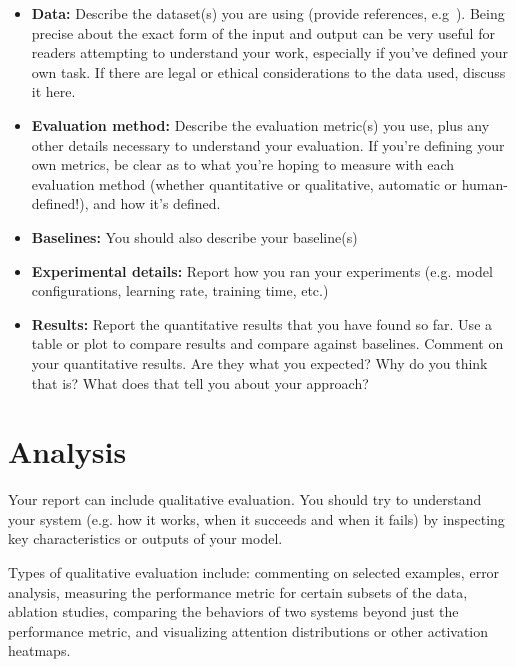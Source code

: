 \documentclass[11pt]{article}
\begin{document}
\begin{itemize}
    \item \textbf{Data:} Describe the dataset(s) you are using (provide references, e.g~\cite{nakano2021webgpt}). Being precise about the exact form of the input and output can be very useful for readers attempting to understand your work, especially if you’ve defined your own task. If there are legal or ethical considerations to the data used, discuss it here.
    \item \textbf{Evaluation method:} Describe the evaluation metric(s) you use, plus any other details necessary to understand your evaluation. If you’re defining your own metrics, be clear as to what you’re hoping to measure with each evaluation method (whether quantitative or qualitative, automatic or human-defined!), and how it’s defined.
    \item \textbf{Baselines:} You should also describe your baseline(s)
    \item \textbf{Experimental details:} Report how you ran your experiments (e.g. model configurations, learning rate, training time, etc.)
    \item \textbf{Results:} Report the quantitative results that you have found so far. Use a table or plot to compare results and compare against baselines. Comment on your quantitative results. Are they what you expected? Why do you think that is? What does that tell you about your approach?
\end{itemize}



\section{Analysis} 
Your report can include qualitative evaluation. You should try to understand your system (e.g. how it works, when it succeeds and when it fails) by inspecting key characteristics or outputs of your model.

Types of qualitative evaluation include: commenting on selected examples, error analysis, measuring the performance metric for certain subsets of the data, ablation studies, comparing the behaviors of two systems beyond just the performance metric, and visualizing attention distributions or other activation heatmaps.
\end{document}
